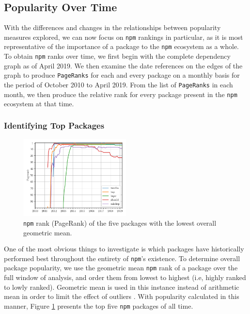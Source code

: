 \documentclass[10pt,conference]{IEEEtran}
\def\code#1{\texttt{#1}}
\begin{document}
\subsection{Popularity Over Time}

With the differences and changes in the relationships between
popularity measures explored, we can now focus on \code{npm}
rankings in particular, as it is most representative of the 
importance of a package to the \code{npm} ecosystem as a whole.
To obtain \code{npm} ranks over time, we first begin with the
complete dependency graph as of April 2019. We then examine
the date references on the edges of the graph to produce \code{PageRanks}
for each and every package on a monthly basis for the period of October 2010
to April 2019. From the list of \code{PageRanks} in each month, we then
produce the relative rank for every package present in the \code{npm}
ecosystem at that time. 

\subsubsection{Identifying Top Packages}

\begin{figure}
  \includegraphics[width=0.5\textwidth]{figures/geo_mean_highest_pagerank.pdf}
  \caption{\code{npm} rank (PageRank) of the five packages with the lowest overall geometric mean.}
  \label{topFive}
\end{figure}

One of the most obvious things to investigate is which packages
have historically performed best throughout the entirety of 
\code{npm}'s existence. To determine overall package popularity,
we use the geometric mean \code{npm} rank of a package over the full 
window of analysis, and order them from lowest to highest (i.e,
highly ranked to lowly ranked). Geometric mean is used in this instance
instead of arithmetic mean in order to limit the effect of outliers \cite{Wittern:2016}.
With popularity calculated in this manner, Figure \ref{topFive} presents 
the top five \code{npm} packages of all time.
\end{document}
